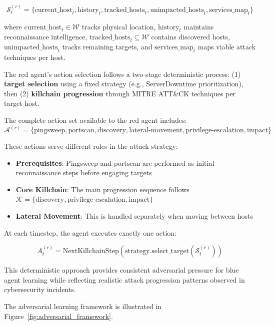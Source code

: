 \documentclass[12pt,oneside]{article}
\begin{document}
\begin{equation}
\mathcal{S}^{(r)}_t = \{\text{current\_host}_t, \text{history}_t, \text{tracked\_hosts}_t, \text{unimpacted\_hosts}_t, \text{services\_map}_t\}
\end{equation}

where $\text{current\_host}_t \in \mathcal{W}$ tracks physical location, $\text{history}_t$ maintains reconnaissance intelligence, $\text{tracked\_hosts}_t \subseteq \mathcal{W}$ contains discovered hosts, $\text{unimpacted\_hosts}_t$ tracks remaining targets, and $\text{services\_map}_t$ maps viable attack techniques per host.

The red agent's action selection follows a two-stage deterministic process: (1) \textbf{target selection} using a fixed strategy (e.g., ServerDowntime prioritization), then (2) \textbf{killchain progression} through MITRE ATT\&CK techniques per target host.

The complete action set available to the red agent includes:
$$\mathcal{A}^{(r)} = \{\text{pingsweep}, \text{portscan}, \text{discovery}, \text{lateral-movement}, \text{privilege-escalation}, \text{impact}\}$$

These actions serve different roles in the attack strategy:
\begin{itemize}
\item \textbf{Prerequisites}: Pingsweep and portscan are performed as initial reconnaissance steps before engaging targets
\item \textbf{Core Killchain}: The main progression sequence follows $\mathcal{K} = \{\text{discovery}, \text{privilege-escalation}, \text{impact}\}$  
\item \textbf{Lateral Movement}: This is handled separately when moving between hosts
\end{itemize}

At each timestep, the agent executes exactly one action:

\begin{equation}
A_t^{(r)} = \text{NextKillchainStep}(\text{strategy.select\_target}(\mathcal{S}^{(r)}_t))
\end{equation}

This deterministic approach provides consistent adversarial pressure for blue agent learning while reflecting realistic attack progression patterns observed in cybersecurity incidents.

The adversarial learning framework is illustrated in Figure~\ref{fig:adversarial_framework}.
\end{document}
